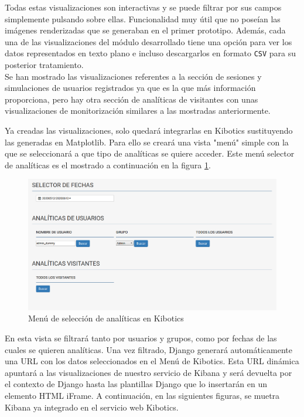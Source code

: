 \documentclass[11pt,a4paper]{book}
\begin{document}
				
				Todas estas visualizaciones son interactivas y se puede filtrar por sus campos simplemente pulsando sobre ellas. Funcionalidad muy útil que no poseían las imágenes renderizadas que se generaban en el primer prototipo. Además, cada una de las visualizaciones del módulo desarrollado tiene una opción para ver los datos representados en texto plano e incluso descargarlos en formato \texttt{CSV} para su posterior tratamiento.\\
					
				Se han mostrado las visualizaciones referentes a la sección de sesiones y simulaciones de usuarios registrados ya que es la que más información proporciona, pero hay otra sección de analíticas de visitantes con unas visualizaciones de monitorización similares a las mostradas anteriormente.
				
				Ya creadas las visualizaciones, solo quedará integrarlas en Kibotics sustituyendo las generadas en Matplotlib. Para ello se creará una vista "menú" simple con la que se seleccionará a que tipo de analíticas se quiere acceder. Este menú selector de analíticas es el mostrado a continuación en la figura \ref{fig:kibotics_analytics_menu}.

				\begin{figure}[H]
					\centering
					\includegraphics[width=14cm, keepaspectratio]{img/kibotics_analytics_menu.png}
					\caption{Menú de selección de analíticas en Kibotics}
					\label{fig:kibotics_analytics_menu}
				\end{figure}
			
				En esta vista se filtrará tanto por usuarios y grupos, como por fechas de las cuales se quieren analíticas. Una vez filtrado, Django generará automáticamente una URL con los datos seleccionados en el Menú de Kibotics. Esta URL dinámica apuntará a las visualizaciones de nuestro servicio de Kibana y será devuelta por el contexto de Django hasta las plantillas Django que lo insertarán en un elemento HTML iFrame. A continuación, en las siguientes figuras, se muetra Kibana ya integrado en el servicio web Kibotics.
					
\end{document}
